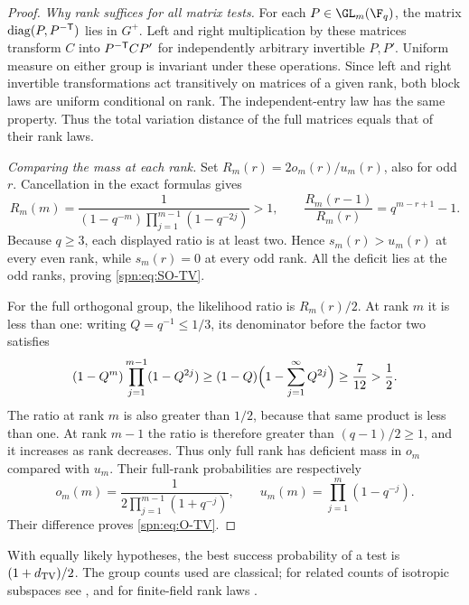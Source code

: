 \begin{proof}
\emph{Why rank suffices for all matrix tests.} For each $P\in\GL_m(\F_q)$,
the matrix $\operatorname{diag}(P,P^{-\mathsf{T}})$ lies in $G^+$. Left and right
multiplication by these matrices transform $C$ into $P^{-\mathsf{T}}CP'$ for
independently arbitrary invertible $P,P'$. Uniform measure on either group is
invariant under these operations. Since left and right invertible
transformations act transitively on matrices of a given rank, both block
laws are uniform conditional on rank. The independent-entry law has the same
property. Thus the total variation distance of the full matrices equals that
of their rank laws.

\emph{Comparing the mass at each rank.} Set $R_m(r)=2o_m(r)/u_m(r)$, also for
odd $r$. Cancellation in the exact formulas gives
\[
 R_m(m)=\frac{1}{(1-q^{-m})\prod_{j=1}^{m-1}(1-q^{-2j})}>1,\qquad
 \frac{R_m(r-1)}{R_m(r)}=q^{m-r+1}-1 .
\]
Because $q\ge3$, each displayed ratio is at least two. Hence
$s_m(r)>u_m(r)$ at every even rank, while $s_m(r)=0$ at every odd rank. All
the deficit lies at the odd ranks, proving \eqref{spn:eq:SO-TV}.

For the full orthogonal group, the likelihood ratio is $R_m(r)/2$. At rank
$m$ it is less than one: writing $Q=q^{-1}\le1/3$, its denominator before the
factor two satisfies
\[
 (1-Q^m)\prod_{j=1}^{m-1}(1-Q^{2j})
 \ge(1-Q)\Bigl(1-\sum_{j=1}^{\infty}Q^{2j}\Bigr)\ge\frac{7}{12}>\frac12 .
\]
The ratio at rank $m$ is also greater than $1/2$, because that same product
is less than one. At rank $m-1$ the ratio is therefore greater than
$(q-1)/2\ge1$, and it increases as rank decreases. Thus only full rank has
deficient mass in $o_m$ compared with $u_m$. Their full-rank probabilities
are respectively
\[
 o_m(m)=\frac{1}{2\prod_{j=1}^{m-1}(1+q^{-j})},\qquad
 u_m(m)=\prod_{j=1}^{m}(1-q^{-j}).
\]
Their difference proves \eqref{spn:eq:O-TV}.
\end{proof}

With equally likely hypotheses, the best success probability of a test is
$(1+d_{\mathrm{TV}})/2$. The group counts used are classical; for related counts of
isotropic subspaces see \cite[Lemma~3.2.2]{Li2022Arithmetic}, and for
finite-field rank laws \cite{Fulman2015Stein}.

